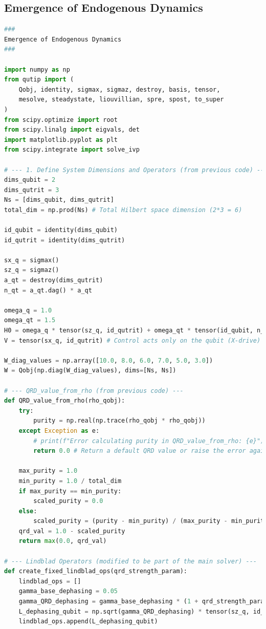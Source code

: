 \documentclass[9pt]{article}
\begin{document}
\subsection{Emergence of Endogenous Dynamics}
\begin{lstlisting}[language=Python, basicstyle=\ttfamily\footnotesize, breaklines=true, frame=single, caption={Python Code for Emergence of Endogenous Dynamics}, label={lst:qrd_code}]
###
Emergence of Endogenous Dynamics
###

import numpy as np
from qutip import (
    Qobj, identity, sigmax, sigmaz, destroy, basis, tensor,
    mesolve, steadystate, liouvillian, spre, spost, to_super
)
from scipy.optimize import root
from scipy.linalg import eigvals, det
import matplotlib.pyplot as plt
from scipy.integrate import solve_ivp

# --- 1. Define System Dimensions and Operators (from previous code) ---
dims_qubit = 2
dims_qutrit = 3
Ns = [dims_qubit, dims_qutrit]
total_dim = np.prod(Ns) # Total Hilbert space dimension (2*3 = 6)

id_qubit = identity(dims_qubit)
id_qutrit = identity(dims_qutrit)

sx_q = sigmax()
sz_q = sigmaz()
a_qt = destroy(dims_qutrit)
n_qt = a_qt.dag() * a_qt

omega_q = 1.0
omega_qt = 1.5
H0 = omega_q * tensor(sz_q, id_qutrit) + omega_qt * tensor(id_qubit, n_qt)
V = tensor(sx_q, id_qutrit) # Control acts only on the qubit (X-drive)

W_diag_values = np.array([10.0, 8.0, 6.0, 7.0, 5.0, 3.0])
W = Qobj(np.diag(W_diag_values), dims=[Ns, Ns])

# --- QRD_value_from_rho (from previous code) ---
def QRD_value_from_rho(rho_qobj):
    try:
        purity = np.real(np.trace(rho_qobj * rho_qobj))
    except Exception as e:
        # print(f"Error calculating purity in QRD_value_from_rho: {e}") # Suppress for cleaner output
        return 0.0 # Return a default QRD value or raise the error again

    max_purity = 1.0
    min_purity = 1.0 / total_dim
    if max_purity == min_purity:
        scaled_purity = 0.0
    else:
        scaled_purity = (purity - min_purity) / (max_purity - min_purity)
    qrd_val = 1.0 - scaled_purity
    return max(0.0, qrd_val)

# --- Lindblad Operators (modified to be part of the main solver) ---
def create_fixed_lindblad_ops(qrd_strength_param):
    lindblad_ops = []
    gamma_base_dephasing = 0.05
    gamma_QRD_dephasing = gamma_base_dephasing * (1 + qrd_strength_param * 2.0)
    L_dephasing_qubit = np.sqrt(gamma_QRD_dephasing) * tensor(sz_q, id_qutrit)
    lindblad_ops.append(L_dephasing_qubit)


\end{lstlisting}
\end{document}
